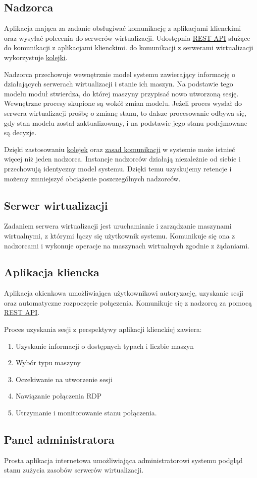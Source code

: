 \documentclass[../deliverable-two.tex]{subfiles}
\begin{document}
\label{modules}

\subsection{Nadzorca}

Aplikacja mająca za zadanie obsługiwać komunikację z aplikacjami klienckimi oraz wysyłać polecenia do serwerów wirtualizacji. Udostępnia \hyperref[communication:api]{REST API} służące do komunikacji z aplikacjami klienckimi. do komunikacji z serwerami wirtualizacji wykorzystuje \hyperref[external-modules:broker]{kolejki}.

Nadzorca przechowuje wewnętrznie model systemu zawierający informację o działających serwerach wirtualizacji i stanie ich maszyn. Na podstawie tego modelu moduł stwierdza, do której maszyny przypisać nowo utworzoną sesję. Wewnętrzne procesy skupione są wokół zmian modelu. Jeżeli proces wysłał do serwera wirtualizacji prośbę o zmianę stanu, to dalsze procesowanie odbywa się, gdy stan modelu został zaktualizowany, i na podstawie jego stanu podejmowane są decyzje.

Dzięki zastosowaniu \hyperref[external-modules:broker]{kolejek} oraz \hyperref[communication:broker]{zasad komunikacji} w systemie może istnieć więcej niż jeden nadzorca. Instancje nadzorców działają niezależnie od siebie i przechowują identyczny model systemu. Dzięki temu uzyskujemy retencje i możemy zmniejszyć obciążenie poszczególnych nadzorców.

\subsection{Serwer wirtualizacji}

Zadaniem serwera wirtualizacji jest uruchamianie i zarządzanie maszynami wirtualnymi, z którymi łączy się użytkownik systemu. Komunikuje się ona z nadzorcami i wykonuje operacje na maszynach wirtualnych zgodnie z żądaniami.

\subsection{Aplikacja kliencka}

Aplikacja okienkowa umożliwiająca użytkownikowi autoryzację, uzyskanie sesji oraz automatyczne rozpoczęcie połączenia. Komunikuje się z nadzorcą za pomocą \hyperref[communication:api]{REST API}.

Proces uzyskania sesji z perspektywy aplikacji klienckiej zawiera:
\begin{enumerate}
    \item Uzyskanie informacji o dostępnych typach i liczbie maszyn
    \item Wybór typu maszyny
    \item Oczekiwanie na utworzenie sesji
    \item Nawiązanie połączenia RDP
    \item Utrzymanie i monitorowanie stanu połączenia.
\end{enumerate}

\subsection{Panel administratora}

Prosta aplikacja internetowa umożliwiająca administratorowi systemu podgląd stanu zużycia zasobów serwerów wirtualizacji.
\end{document}
